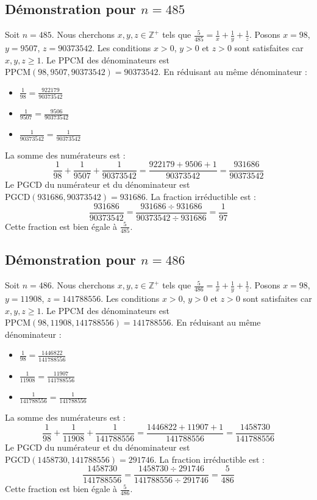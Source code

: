 \documentclass[11pt,a4paper]{article}
\begin{document}
\subsection{Démonstration pour $n = 485$}
Soit $n = 485$. Nous cherchons $x, y, z \in \mathbb{Z}^{+}$ tels que $\frac{5}{485} = \frac{1}{x} + \frac{1}{y} + \frac{1}{z}$.
Posons $x = 98$, $y = 9507$, $z = 90373542$.
Les conditions $x > 0$, $y > 0$ et $z > 0$ sont satisfaites car $x, y, z \geq 1$.
Le PPCM des dénominateurs est $\text{PPCM}(98, 9507, 90373542) = 90373542$.
En réduisant au même dénominateur :
\begin{itemize}
    \item $\frac{1}{98} = \frac{922179}{90373542}$
    \item $\frac{1}{9507} = \frac{9506}{90373542}$
    \item $\frac{1}{90373542} = \frac{1}{90373542}$
\end{itemize}
La somme des numérateurs est :
$$ \frac{1}{98} + \frac{1}{9507} + \frac{1}{90373542} = \frac{922179 + 9506 + 1}{90373542} = \frac{931686}{90373542} $$
Le PGCD du numérateur et du dénominateur est $\text{PGCD}(931686, 90373542) = 931686$.
La fraction irréductible est :
$$ \frac{931686}{90373542} = \frac{931686 \div 931686}{90373542 \div 931686} = \frac{1}{97} $$
Cette fraction est bien égale à $\frac{5}{485}$.

\subsection{Démonstration pour $n = 486$}
Soit $n = 486$. Nous cherchons $x, y, z \in \mathbb{Z}^{+}$ tels que $\frac{5}{486} = \frac{1}{x} + \frac{1}{y} + \frac{1}{z}$.
Posons $x = 98$, $y = 11908$, $z = 141788556$.
Les conditions $x > 0$, $y > 0$ et $z > 0$ sont satisfaites car $x, y, z \geq 1$.
Le PPCM des dénominateurs est $\text{PPCM}(98, 11908, 141788556) = 141788556$.
En réduisant au même dénominateur :
\begin{itemize}
    \item $\frac{1}{98} = \frac{1446822}{141788556}$
    \item $\frac{1}{11908} = \frac{11907}{141788556}$
    \item $\frac{1}{141788556} = \frac{1}{141788556}$
\end{itemize}
La somme des numérateurs est :
$$ \frac{1}{98} + \frac{1}{11908} + \frac{1}{141788556} = \frac{1446822 + 11907 + 1}{141788556} = \frac{1458730}{141788556} $$
Le PGCD du numérateur et du dénominateur est $\text{PGCD}(1458730, 141788556) = 291746$.
La fraction irréductible est :
$$ \frac{1458730}{141788556} = \frac{1458730 \div 291746}{141788556 \div 291746} = \frac{5}{486} $$
Cette fraction est bien égale à $\frac{5}{486}$.
\end{document}
